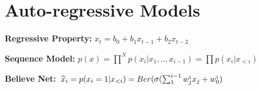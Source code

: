 \section{Auto-regressive Models}

\textbf{Regressive Property:} $x_t = b_0 + b_1 x_{t-1} + b_2 x_{t-2}$

\textbf{Sequence Model:} $p(x) = \prod^N p(x_i | x_1,..,x_{i-1}) = \prod p(x_i | x_{<i})$\\

\textbf{Believe Net:} $\widehat{x}_i = p(x_i = 1 | x_{<i}) = Ber(\sigma(\sum_1^{i-1} w_j^i x_j + w_0^i)$

